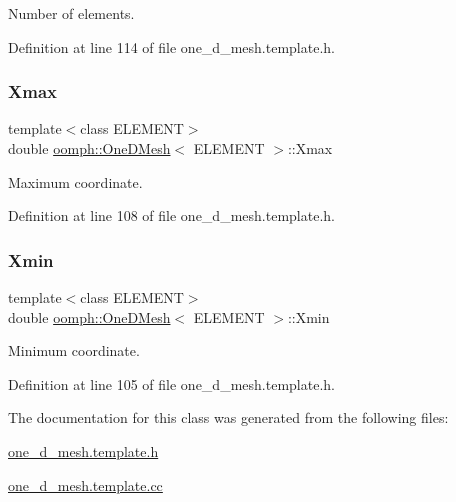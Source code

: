Number of elements. 



Definition at line 114 of file one\+\_\+d\+\_\+mesh.\+template.\+h.

\mbox{\label{classoomph_1_1OneDMesh_ac625d93f5299895ad5801918a20aea31}} 
\subsubsection{\texorpdfstring{Xmax}{Xmax}}
{\footnotesize\ttfamily template$<$class E\+L\+E\+M\+E\+NT$>$ \\
double \hyperlink{classoomph_1_1OneDMesh}{oomph\+::\+One\+D\+Mesh}$<$ E\+L\+E\+M\+E\+NT $>$\+::Xmax\hspace{0.3cm}{\ttfamily [protected]}}



Maximum coordinate. 



Definition at line 108 of file one\+\_\+d\+\_\+mesh.\+template.\+h.

\mbox{\label{classoomph_1_1OneDMesh_ab1c25c2437f203dd1f6d42ec0613e6a1}} 
\subsubsection{\texorpdfstring{Xmin}{Xmin}}
{\footnotesize\ttfamily template$<$class E\+L\+E\+M\+E\+NT$>$ \\
double \hyperlink{classoomph_1_1OneDMesh}{oomph\+::\+One\+D\+Mesh}$<$ E\+L\+E\+M\+E\+NT $>$\+::Xmin\hspace{0.3cm}{\ttfamily [protected]}}



Minimum coordinate. 



Definition at line 105 of file one\+\_\+d\+\_\+mesh.\+template.\+h.



The documentation for this class was generated from the following files\+:\begin{DoxyCompactItemize}
\item 
\hyperlink{one__d__mesh_8template_8h}{one\+\_\+d\+\_\+mesh.\+template.\+h}\item 
\hyperlink{one__d__mesh_8template_8cc}{one\+\_\+d\+\_\+mesh.\+template.\+cc}\end{DoxyCompactItemize}
